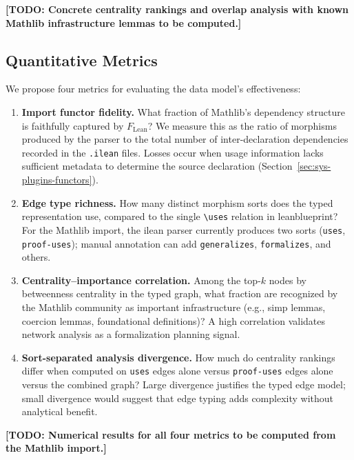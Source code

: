 \textbf{[TODO: Concrete centrality rankings and overlap analysis with known Mathlib infrastructure lemmas to be computed.]}


\subsection{Quantitative Metrics}
\label{sec:eval-metrics}

We propose four metrics for evaluating the data model's effectiveness:

\begin{enumerate}
    \item \textbf{Import functor fidelity.} What fraction of Mathlib's dependency structure is faithfully captured by $F_{\mathrm{Lean}}$? We measure this as the ratio of morphisms produced by the parser to the total number of inter-declaration dependencies recorded in the \texttt{.ilean} files. Losses occur when usage information lacks sufficient metadata to determine the source declaration (Section~\ref{sec:sys-plugins-functors}).

    \item \textbf{Edge type richness.} How many distinct morphism sorts does the typed representation use, compared to the single \texttt{\textbackslash uses} relation in leanblueprint? For the Mathlib import, the ilean parser currently produces two sorts (\texttt{uses}, \texttt{proof-uses}); manual annotation can add \texttt{generalizes}, \texttt{formalizes}, and others.

    \item \textbf{Centrality--importance correlation.} Among the top-$k$ nodes by betweenness centrality in the typed graph, what fraction are recognized by the Mathlib community as important infrastructure (e.g., simp lemmas, coercion lemmas, foundational definitions)? A high correlation validates network analysis as a formalization planning signal.

    \item \textbf{Sort-separated analysis divergence.} How much do centrality rankings differ when computed on \texttt{uses} edges alone versus \texttt{proof-uses} edges alone versus the combined graph? Large divergence justifies the typed edge model; small divergence would suggest that edge typing adds complexity without analytical benefit.
\end{enumerate}

\textbf{[TODO: Numerical results for all four metrics to be computed from the Mathlib import.]}


